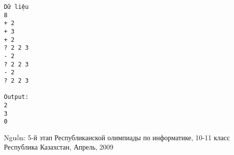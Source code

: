 \begin{verbatim}
Dữ liệu
8			
+ 2		
+ 3		
+ 2		
? 2 2 3
- 2		
? 2 2 3
- 2		
? 2 2 3

Output:
2
3
0
\end{verbatim}

   Nguồn: 5-й этап Республиканской олимпиады по информатике, 10-11 класс Республика Казахстан, Апрель, 2009
